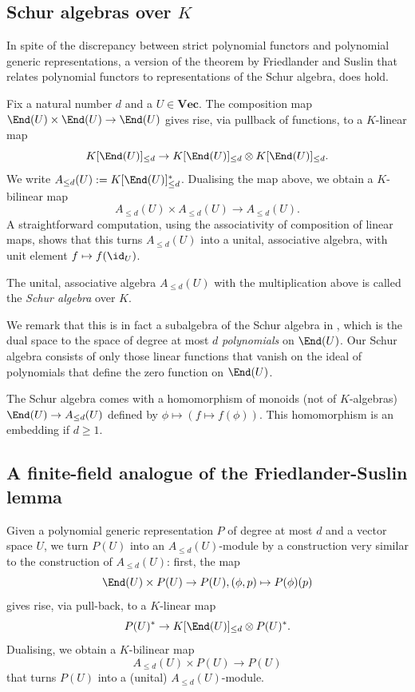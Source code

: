 \documentclass{amsart}
\renewcommand{\Vec}{\mathbf{Vec}}
\begin{document}
\subsection{Schur algebras over $K$}

In spite of the discrepancy between strict polynomial functors
and polynomial generic representations, a version of the theorem by
Friedlander and Suslin that relates polynomial functors to representations
of the Schur algebra, does hold.

Fix a natural number $d$ and a $U \in \Vec$.  The composition map $\End(U)
\times \End(U) \to \End(U)$ gives rise, via pullback of functions,
to a $K$-linear map
\[ K[\End(U)]_{\leq d} \to K[\End(U)]_{\leq d} \otimes
K[\End(U)]_{\leq d}. \]
We write $A_{\leq d}(U):=K[\End(U)]_{\leq d}^*$. Dualising the map
above, we obtain a $K$-bilinear map 
\[ A_{\leq d}(U) \times A_{\leq d}(U) \to A_{\leq d}(U). \]
A straightforward computation, using the associativity of composition
of linear maps, shows that this turns $A_{\leq d}(U)$ into a unital,
associative algebra, with unit element $f \mapsto f(\id_U)$.

\begin{de}
The unital, associative algebra $A_{\leq d}(U)$ with the multiplication 
above is called the {\em Schur algebra} over $K$.
\end{de}

We remark that this is in fact a subalgebra of the Schur algebra in
\cite{Friedlander97}, which is the dual space to the space of degree
at most $d$ {\em polynomials} on $\End(U)$. Our Schur algebra consists
of only those linear functions that vanish on the ideal of polynomials
that define the zero function on $\End(U)$.

The Schur algebra comes with a homomorphism of monoids (not of
$K$-algebras) $\End(U) \to A_{\leq d}(U)$ defined by $\phi \mapsto
(f \mapsto f(\phi))$. This homomorphism is an embedding if $d \geq 1$.

\subsection{A finite-field analogue of the Friedlander-Suslin lemma}

Given a polynomial generic representation $P$ of degree at most $d$
and a vector space $U$, we turn $P(U)$ into an $A_{\leq d}(U)$-module
by a construction very similar to the construction of $A_{\leq d}(U)$:
first, the map
\[ \End(U) \times P(U) \to P(U), (\phi,p) \mapsto P(\phi)(p) \]
gives rise, via pull-back, to a $K$-linear map 
\[ P(U)^* \to K[\End(U)]_{\leq d} \otimes P(U)^*. \]
Dualising, we obtain a $K$-bilinear map  
\[ A_{\leq d}(U) \times P(U) \to P(U) \]
that turns $P(U)$ into a (unital) $A_{\leq d}(U)$-module. 
\end{document}
